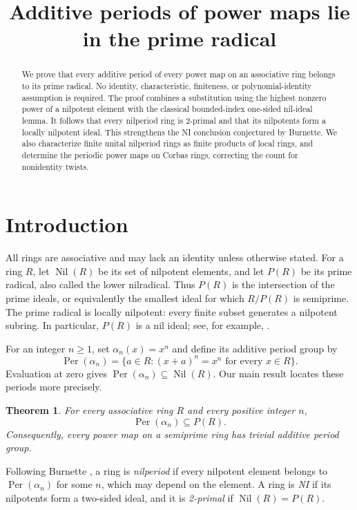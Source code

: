 \documentclass[11pt]{article}
\title{Additive periods of power maps lie in the prime radical}
\author{}
\date{}
\newtheorem{theorem}{Theorem}
\theoremstyle{remark}
\DeclareMathOperator{\Nil}{Nil}
\DeclareMathOperator{\Per}{Per}
\begin{document}
\maketitle
\begin{abstract}
We prove that every additive period of every power map on an associative ring
belongs to its prime radical. No identity, characteristic, finiteness, or
polynomial-identity assumption is required. The proof combines a substitution
using the highest nonzero power of a nilpotent element with the classical
bounded-index one-sided nil-ideal lemma. It follows that every nilperiod ring
is 2-primal and that its nilpotents form a locally nilpotent ideal. This
strengthens the NI conclusion conjectured by Burnette. We also characterize
finite unital nilperiod rings as finite products of local rings, and determine
the periodic power maps on Corbas rings, correcting the count for nonidentity
twists.
\end{abstract}

\section{Introduction}
All rings are associative and may lack an identity unless otherwise stated.
For a ring $R$, let $\Nil(R)$ be its set of nilpotent elements, and let $P(R)$
be its prime radical, also called the lower nilradical. Thus $P(R)$ is the
intersection of the prime ideals, or equivalently the smallest ideal for which
$R/P(R)$ is semiprime. The prime radical is locally nilpotent: every finite
subset generates a nilpotent subring. In particular, $P(R)$ is a nil ideal;
see, for example, \cite[Section~1]{Nielsen}.

For an integer $n\geq1$, set $\alpha_n(x)=x^n$ and define its additive period
group by
\[
 \Per(\alpha_n)=\{a\in R:(x+a)^n=x^n\text{ for every }x\in R\}.
\]
Evaluation at zero gives $\Per(\alpha_n)\subseteq\Nil(R)$. Our main result
locates these periods more precisely.

\begin{theorem}\label{thm:main}
For every associative ring $R$ and every positive integer $n$,
\[
 \Per(\alpha_n)\subseteq P(R).
\]
Consequently, every power map on a semiprime ring has trivial additive period
group.
\end{theorem}

Following Burnette \cite{Burnette}, a ring is \emph{nilperiod} if every
nilpotent element belongs to $\Per(\alpha_n)$ for some $n$, which may depend
on the element. A ring is \emph{NI} if its nilpotents form a two-sided ideal,
and it is \emph{2-primal} if $\Nil(R)=P(R)$.
\end{document}
